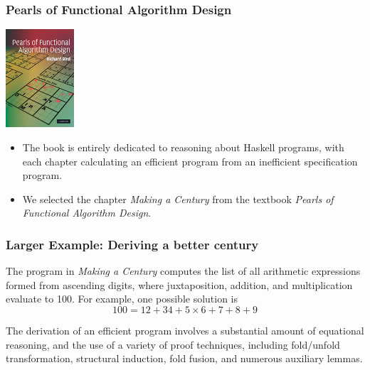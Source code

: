 


\begin{frame}

\frametitle{Pearls of Functional Algorithm Design}

\begin{centering}

\includegraphics[width=1in]{Pictures/bird.pdf}

\end{centering}

\begin{itemize}
\item The book is entirely dedicated to reasoning about Haskell programs, with each chapter calculating an efficient program from an inefficient specification program.
\item We selected the chapter \emph{Making a Century} from the textbook \emph{Pearls of Functional Algorithm Design}.
\end{itemize}


\end{frame}

\begin{frame}
\frametitle{Larger Example: Deriving a better century}

The program in \emph{Making a Century} computes the list of all arithmetic expressions formed from ascending digits, where juxtaposition, addition, and multiplication evaluate to 100.
For example, one possible solution is
\[
100 = 12 + 34 + 5 \times 6 + 7 + 8 + 9
\]

The derivation of an efficient program involves a substantial amount of equational reasoning, and the use of a variety of proof
techniques, including fold/unfold transformation, structural induction, fold fusion, and numerous auxiliary lemmas.

\end{frame}

